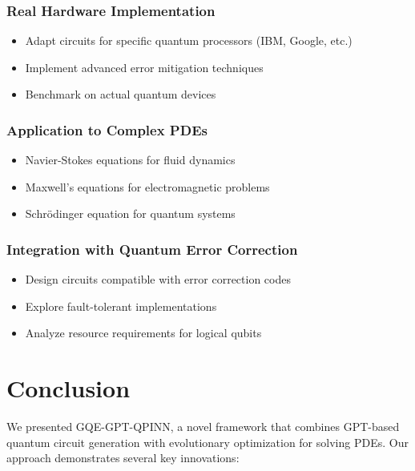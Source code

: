 \documentclass[11pt,a4paper,uplatex,dvipdfmx]{jsarticle}
\begin{document}
\subsubsection{Real Hardware Implementation}
\begin{itemize}
    \item Adapt circuits for specific quantum processors (IBM, Google, etc.)
    \item Implement advanced error mitigation techniques
    \item Benchmark on actual quantum devices
\end{itemize}

\subsubsection{Application to Complex PDEs}
\begin{itemize}
    \item Navier-Stokes equations for fluid dynamics
    \item Maxwell's equations for electromagnetic problems
    \item Schrödinger equation for quantum systems
\end{itemize}

\subsubsection{Integration with Quantum Error Correction}
\begin{itemize}
    \item Design circuits compatible with error correction codes
    \item Explore fault-tolerant implementations
    \item Analyze resource requirements for logical qubits
\end{itemize}

\section{Conclusion}

We presented GQE-GPT-QPINN, a novel framework that combines GPT-based quantum circuit generation with evolutionary optimization for solving PDEs. Our approach demonstrates several key innovations:
\end{document}

